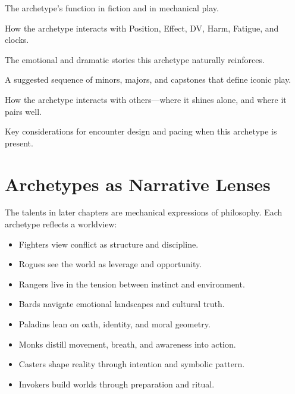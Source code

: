 \documentclass[11pt]{book}
\begin{document}
\begin{description}[leftmargin=1.8em]
    \item[Role Summary]  
    The archetype's function in fiction and in mechanical play.

    \item[Mechanical Silhouette]  
    How the archetype interacts with Position, Effect, DV, Harm, Fatigue, and clocks.

    \item[Playstyle Themes]  
    The emotional and dramatic stories this archetype naturally reinforces.

    \item[Talent Progression Path]  
    A suggested sequence of minors, majors, and capstones that define iconic play.

    \item[Synergy Notes]  
    How the archetype interacts with others---where it shines alone, and where it pairs well.

    \item[GM Flags]  
    Key considerations for encounter design and pacing when this archetype is present.
\end{description}

\section*{Archetypes as Narrative Lenses}

The talents in later chapters are mechanical expressions of philosophy.  
Each archetype reflects a worldview:

\begin{itemize}
    \item Fighters view conflict as structure and discipline.  
    \item Rogues see the world as leverage and opportunity.  
    \item Rangers live in the tension between instinct and environment.  
    \item Bards navigate emotional landscapes and cultural truth.  
    \item Paladins lean on oath, identity, and moral geometry.  
    \item Monks distill movement, breath, and awareness into action.  
    \item Casters shape reality through intention and symbolic pattern.  
    \item Invokers build worlds through preparation and ritual.  
\end{itemize}
\end{document}
